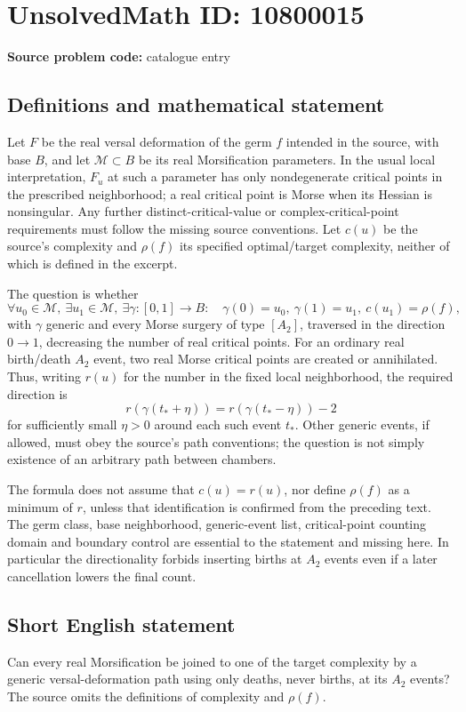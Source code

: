 \documentclass[11pt]{article}
\begin{document}
\section*{UnsolvedMath ID: 10800015}
\textbf{Source problem code:} catalogue entry
\subsection{Definitions and mathematical statement}
Let \(F\) be the real versal deformation of the germ \(f\) intended in the source, with base \(B\), and let \(\mathcal M\subset B\) be its real Morsification parameters. In the usual local interpretation, \(F_u\) at such a parameter has only nondegenerate critical points in the prescribed neighborhood; a real critical point is Morse when its Hessian is nonsingular. Any further distinct-critical-value or complex-critical-point requirements must follow the missing source conventions. Let \(c(u)\) be the source's complexity and \(\rho(f)\) its specified optimal/target complexity, neither of which is defined in the excerpt.

The question is whether
\[\forall u_0\in\mathcal M,\ \exists u_1\in\mathcal M,\ \exists\gamma:[0,1]\to B:\quad
\gamma(0)=u_0,\ \gamma(1)=u_1,\ c(u_1)=\rho(f),\]
with \(\gamma\) generic and every Morse surgery of type \([A_2]\), traversed in the direction \(0\to1\), decreasing the number of real critical points. For an ordinary real birth/death \(A_2\) event, two real Morse critical points are created or annihilated. Thus, writing \(r(u)\) for the number in the fixed local neighborhood, the required direction is
\[r(\gamma(t_*+\eta))=r(\gamma(t_*-\eta))-2\]
for sufficiently small \(\eta>0\) around each such event \(t_*\). Other generic events, if allowed, must obey the source's path conventions; the question is not simply existence of an arbitrary path between chambers.

The formula does not assume that \(c(u)=r(u)\), nor define \(\rho(f)\) as a minimum of \(r\), unless that identification is confirmed from the preceding text. The germ class, base neighborhood, generic-event list, critical-point counting domain and boundary control are essential to the statement and missing here. In particular the directionality forbids inserting births at \(A_2\) events even if a later cancellation lowers the final count.
\subsection{Short English statement}
Can every real Morsification be joined to one of the target complexity by a generic versal-deformation path using only deaths, never births, at its \(A_2\) events? The source omits the definitions of complexity and \(\rho(f)\).
\end{document}
